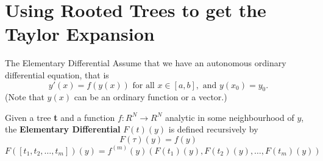 \documentclass{beamer}
\begin{document}
\section[Rooted Trees Taylor Expansion]{Using Rooted Trees to get the Taylor Expansion}

\begin{frame}{The Elementary Differential}
Assume that we have an autonomous ordinary differential equation, that is
$$y'(x) = f(y(x)) \mbox{ for all } x \in \left[a,b\right], \mbox{ and } y(x_0) = y_0.$$
(Note that $y(x)$ can be an ordinary function or a vector.)
\begin{definition}
Given a tree \textbf{t} and a function $f:R^N \to R^N$ analytic in some neighbourhood of $y$,
the \textbf{Elementary Differential} $F(t)(y)$ is defined recursively by
$$F(\tau)(y) = f(y)$$
$$F(\left[t_1, t_2, \dots, t_m \right])(y) = f^{(m)}(y)(F(t_1)(y),F(t_2)(y), \dots, F(t_m)(y))$$
\end{definition}
\end{frame}
\end{document}
